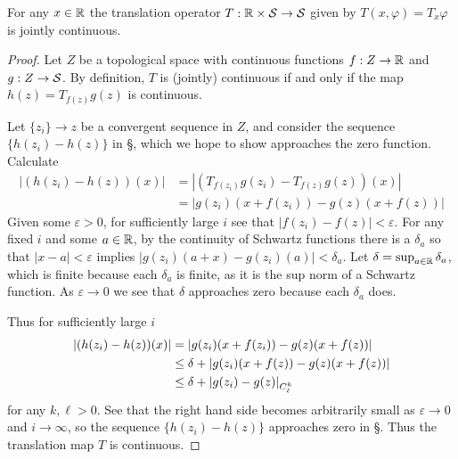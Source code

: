       \begin{claim}
        \label{claim:translcont}
        For any $x\in\R$ the translation operator $T:\R\times\S\rightarrow\S$ given by $T(x,\varphi) = T_x\varphi$ is jointly continuous.
      \end{claim}
      \begin{proof}
        Let $Z$ be a topological space with continuous functions $f:Z\rightarrow\R$ and $g:Z\rightarrow\S$.
        By definition, $T$ is (jointly) continuous if and only if the map $h(z)=T_{f(z)}g(z)$ is continuous.

        Let $\{z_i\}\rightarrow z$ be a convergent sequence in $Z$, and consider the sequence $\{h(z_i)-h(z)\}$ in \S, which we hope to show approaches the zero function.
        Calculate
        \begin{align*}
          \left| (h(z_i)-h(z))(x) \right|
          &= \left| (T_{f(z_i)}g(z_i)-T_{f(z)}g(z))(x) \right|
          \\&= \left| g(z_i)(x+f(z_i)) - g(z)(x+f(z)) \right|
        \end{align*}
        Given some $\varepsilon>0$, for sufficiently large $i$ see that $|f(z_i)-f(z)|<\varepsilon$.
        For any fixed $i$ and some $a\in\R$, by the continuity of Schwartz functions there is a $\delta_a$ so that $|x-a|<\varepsilon$ implies $|g(z_i)(a+x)-g(z_i)(a)|<\delta_a$.
        Let $\delta=\sup_{a\in\R} \delta_a$, which is finite because each $\delta_a$ is finite, as it is the sup norm of a Schwartz function.
        As $\varepsilon\rightarrow0$ we see that $\delta$ approaches zero because each $\delta_a$ does.

        Thus for sufficiently large $i$ 
        \begin{align*}
          \left| (h(z_i)-h(z))(x) \right|
          &= \left| g(z_i)(x+f(z_i)) - g(z)(x+f(z)) \right|
          \\&\le \delta + \left| g(z_i)(x+f(z)) - g(z)(x+f(z)) \right|
          \\&\le \delta + \left|g(z_i)-g(z)\right|_\Ckl
        \end{align*}
        for any $k,\ell>0$.
        See that the right hand side becomes arbitrarily small as $\varepsilon\rightarrow0$ and $i\rightarrow\infty$, so the sequence $\{h(z_i)-h(z)\}$ approaches zero in \S.
        Thus the translation map $T$ is continuous.
      \end{proof}

